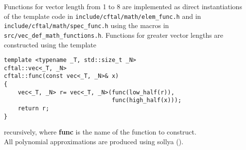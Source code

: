 \documentclass[10pt,a4paper,wide]{article}
\numberwithin{equation}{subsection}
\begin{document}
Functions for vector length from 1 to 8 are implemented as direct
instantiations of the template code in \texttt{include/cftal/math/elem\_func.h}
and in \texttt{include/cftal/math/spec\_func.h}
using the macros in \texttt{src/vec\_def\_math\_functions.h}.
Functions for greater vector lengths are constructed using the template
\begin{lstlisting}
template <typename _T, std::size_t _N>
cftal::vec<_T, _N>
cftal::func(const vec<_T, _N>& x)
{
    vec<_T, _N> r= vec<_T, _N>(func(low_half(r)),
                               func(high_half(x)));
    return r;
}
\end{lstlisting}
recursively, where \textbf{func} is the name of the function to construct.\\
%
All polynomial approximations are produced using sollya
(\cite{ChevillardJoldesLauter2010}).

\pagebreak
\end{document}
